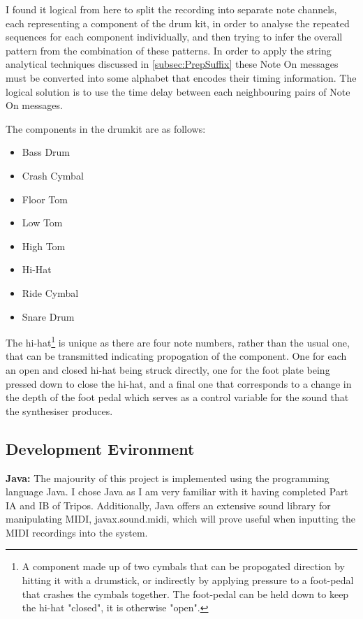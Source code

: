 \documentclass[12pt,twoside,notitlepage]{report}
\begin{document}
			I found it logical from here to split the recording into separate note channels, each representing a component of the drum kit, in order to analyse the repeated sequences for each component individually, and then trying to infer the overall pattern from the combination of these patterns. In order to apply the string analytical techniques discussed in \ref{subsec:PrepSuffix} these Note On messages must be converted into some alphabet that encodes their timing information. The logical solution is to use the time delay between each neighbouring pairs of Note On messages.
			
			The components in the drumkit are as follows:
			\begin{itemize}
				\item{Bass Drum}
				\item{Crash Cymbal}
				\item{Floor Tom}
				\item{Low Tom}
				\item{High Tom}
				\item{Hi-Hat}
				\item{Ride Cymbal}
				\item{Snare Drum}
			\end{itemize}
			
			The hi-hat\footnote{A component made up of two cymbals that can be propogated direction by hitting it with a drumstick, or indirectly by applying pressure to a foot-pedal that crashes the cymbals together. The foot-pedal can be held down to keep the hi-hat "closed", it is otherwise "open".} is unique as there are four note numbers, rather than the usual one, that can be transmitted indicating propogation of the component. One for each an open and closed hi-hat being struck directly, one for the foot plate being pressed down to close the hi-hat, and a final one that corresponds to a change in the depth of the foot pedal which serves as a control variable for the sound that the synthesiser produces. 
			
			
		\subsection{Development Evironment}\label{subsec:tools used: Development Environment}

		\textbf{Java:} The majourity of this project is implemented using the programming language Java. I chose Java as I am very familiar with it having completed Part IA and IB of Tripos. Additionally, Java offers an extensive sound library for manipulating MIDI, javax.sound.midi, which will prove useful when inputting the MIDI recordings into the system.
		
\end{document}
